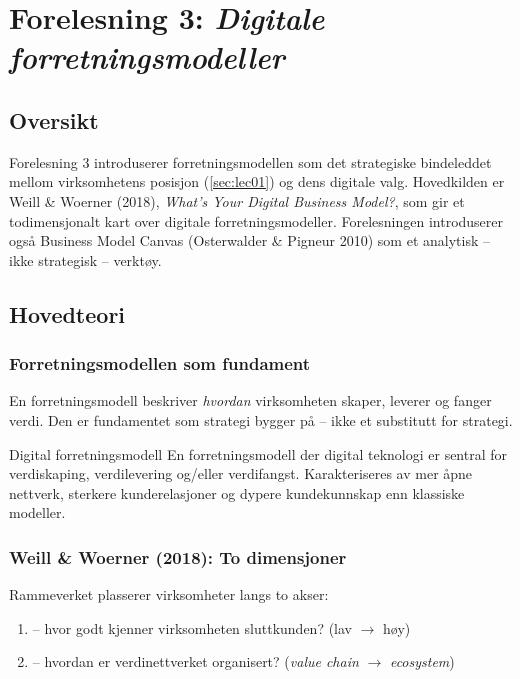 \section{Forelesning 3: \emph{Digitale forretningsmodeller}}
\label{sec:lec03}

\subsection*{Oversikt}
Forelesning 3 introduserer forretningsmodellen som det strategiske bindeleddet
mellom virksomhetens posisjon (\autoref{sec:lec01}) og dens digitale valg.
Hovedkilden er Weill \& Woerner (2018), \emph{What's Your Digital Business Model?},
som gir et todimensjonalt kart over digitale forretningsmodeller. Forelesningen
introduserer også Business Model Canvas (Osterwalder \& Pigneur 2010) som et
analytisk -- ikke strategisk -- verktøy.

\subsection{Hovedteori}

\subsubsection*{Forretningsmodellen som fundament}
En forretningsmodell beskriver \emph{hvordan} virksomheten skaper, leverer og
fanger verdi. Den er fundamentet som strategi bygger på -- ikke et substitutt
for strategi.

\begin{definition}{Digital forretningsmodell}
En forretningsmodell der digital teknologi er sentral for verdiskaping,
verdilevering og/eller verdifangst. Karakteriseres av mer åpne nettverk,
sterkere kunderelasjoner og dypere kundekunnskap enn klassiske modeller.
\end{definition}

\subsubsection*{Weill \& Woerner (2018): To dimensjoner}
Rammeverket plasserer virksomheter langs to akser:
\begin{enumerate}
  \item {} -- hvor godt kjenner virksomheten sluttkunden?
    (lav $\rightarrow$ høy)
  \item {} -- hvordan er verdinettverket organisert?
    (\emph{value chain} $\rightarrow$ \emph{ecosystem})
\end{enumerate}

